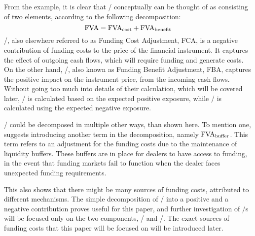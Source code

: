 \documentclass[main.tex]{subfiles}
\begin{document}
        From the example, it is clear that \FVA/ conceptually can be thought of 
        as consisting of two elements, according to the following decomposition:
        \begin{equation*}
            \FVA/ = \FCA/ + \FBA/
        \end{equation*}
        \FCA/, also elsewhere referred to as Funding Cost Adjustment, FCA, 
        is a negative contribution of funding costs to the price of the financial instrument.
        It captures the effect of outgoing cash flows, which will require funding and generate costs.
        On the other hand, \FBA/, also known as Funding Benefit Adjustment, FBA, 
        captures the positive impact on the instrument price, from the incoming cash flows.
        Without going too much into details of their calculation, which will be covered later,
        \FCA/ is calculated based on the expected positive exposure, 
        while \FBA/ is calculated using the expected negative exposure. 

        \FVA/ could be decomposed in multiple other ways, than shown here. 
        To mention one, \textcite{KPMGFVA} suggests introducing another term in the decomposition, 
        namely $\FVA/_{\text{buffer}}$.
        This term refers to an adjustment for the funding costs
        due to the maintenance of liquidity buffers. 
        These buffers are in place for dealers to have access to funding, in the event
        that funding markets fail to function when the dealer faces unexpected funding requirements.

        This also shows that there might be many sources of funding costs,
        attributed to different mechanisms.
        The simple decomposition of \FVA/ into a positive and a negative contribution
        proves useful for this paper,
        and further investigation of \FVA/s will be focused only on the two components,
        \FCA/ and \FBA/.
        The exact sources of funding costs that this paper will be focused on
        will be introduced later.
\end{document}

